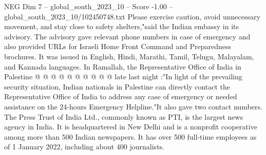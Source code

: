 \begin{textsample}{NEG Dim 7 – global\_south\_2023\_10 – Score -1.00 – global\_south\_2023\_10/102450748.txt}
Please exercise caution, avoid unnecessary movement, and stay close to safety shelters,"said the Indian embassy in its advisory.
The advisory gave relevant phone numbers in case of emergency and also provided URLs for Israeli Home Front Command and Preparedness brochures.
It was issued in English, Hindi, Marathi, Tamil, Telugu, Malayalam, and Kannada languages.
In Ramallah, the Representative Office of India in Palestine @ @ @ @ @ @ @ @ @ @ late last night :"In light of the prevailing security situation, Indian nationals in Palestine can directly contact the Representative Office of India to address any case of emergency or needed assistance on the 24-hours Emergency Helpline."It also gave two contact numbers.
The Press Trust of India Ltd., commonly known as PTI, is the largest news agency in India.
It is headquartered in New Delhi and is a nonprofit cooperative among more than 500 Indian newspapers.
It has over 500 full-time employees as of 1 January 2022, including about 400 journalists.

\end{textsample}

